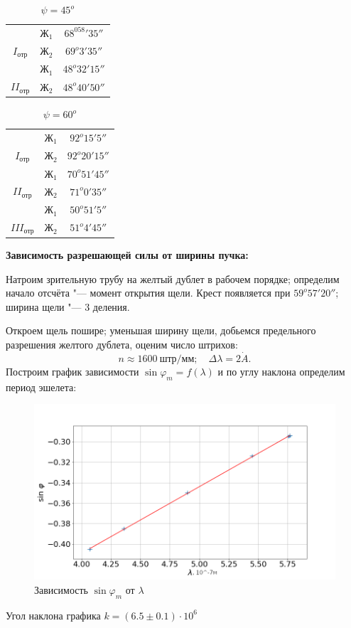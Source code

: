 \documentclass[a4paper]{article}
\begin{document}
\begin{table}[H]
\begin{center}
\begin{tabular}{|c|c|c|} \hline
& $Ж_1$ & $68^058'35''$\\
\cline{2-3}
$I_{отр}$
& $Ж_2$ & $69^o3'35''$ \\\hline
& $Ж_1$ & $48^o32'15''$ \\
\cline{2-3}
$II_{отр}$
& $Ж_2$ & $48^o40'50''$ \\\hline
\end{tabular}
\caption{$\psi = 45^o$}
\end{center}
\end{table}

\begin{table}[H]
\begin{center}
\begin{tabular}{|c|c|c|} \hline
& $Ж_1$ & $92^o15'5''$\\
\cline{2-3}
$I_{отр}$
& $Ж_2$ & $92^o20'15''$ \\\hline
& $Ж_1$ & $70^o51'45''$ \\
\cline{2-3}
$II_{отр}$
& $Ж_2$ & $71^o0'35''$ \\\hline
& $Ж_1$ & $50^o51'5''$\\
\cline{2-3}
$III_{отр}$
& $Ж_2$ & $51^o4'45''$ \\\hline
\end{tabular}
\caption{$\psi = 60^o$}
\end{center}
\end{table}
\textbf{Зависимость разрешающей силы от ширины пучка:}

Натроим зрительную трубу на желтый дублет в рабочем порядке; определим начало отсчёта "--- момент открытия щели. Крест появляется при $59^o57'20''$; ширина щели "--- 3 деления.

Откроем щель пошире; уменьшая ширину щели, добьемся предельного разрешения желтого дублета, оценим число штрихов:
\[
	 n \approx 1600\ штр/мм; \quad \Delta \lambda = 2 \dot A.
\]
Построим график зависимости $\sin \varphi_m = f(\lambda)$ и по углу наклона определим период эшелета:
\begin{figure}[h]
	\includegraphics[width = 1.0\linewidth]{g1.png}
	\caption*{Зависимость $\sin \varphi_m$ от $\lambda$}
\end{figure}
Угол наклона графика $k = (6.5 \pm 0.1)\cdot 10^6$
\end{document}
